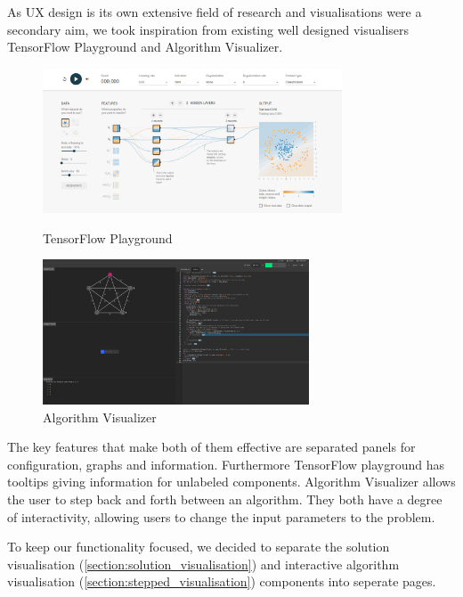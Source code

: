 As UX design is its own extensive field of research and visualisations were a secondary aim, we took inspiration from existing well designed visualisers TensorFlow Playground and Algorithm Visualizer.

\begin{figure}[H]
    \begin{minipage}{0.54\textwidth}
        \includegraphics[height=4.3cm]{images/tensor-flow-playground.png}
        \caption{TensorFlow Playground}
        \label{fig:tensorflow_playground}
    \end{minipage}
    \begin{minipage}{0.46\textwidth}
        \includegraphics[height=4.3cm]{images/algorithm-visualizer.png}
        \caption{Algorithm Visualizer}
        \label{fig:algorithm_visualizer}
    \end{minipage}
\end{figure}

The key features that make both of them effective are separated panels for configuration, graphs and information. Furthermore TensorFlow playground has tooltips giving information for unlabeled components. Algorithm Visualizer allows the user to step back and forth between an algorithm. They both have a degree of interactivity, allowing users to change the input parameters to the problem.

To keep our functionality focused, we decided to separate the solution visualisation (\cref{section:solution_visualisation}) and interactive algorithm visualisation (\cref{section:stepped_visualisation}) components into seperate pages.